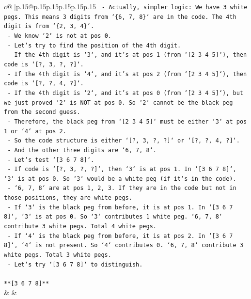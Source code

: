 \documentclass{article}
\begin{document}
{\begin{supertabular}{c@{$\;$}|p{.15\linewidth}@{}p{.15\linewidth}p{.15\linewidth}p{.15\linewidth}p{.15\linewidth}p{.15\linewidth}}
{{{\texttt{    {-} Actually, simpler logic: We have 3 white pegs. This means 3 digits from `\{6, 7, 8\}` are in the code. The 4th digit is from `\{2, 3, 4\}`.} \\
\texttt{    {-} We know `2` is not at pos 0.} \\
\texttt{    {-} Let's try to find the position of the 4th digit.} \\
\texttt{    {-} If the 4th digit is `3`, and it's at pos 1 (from `{[}2 3 4 5{]}`), then code is `{[}?, 3, ?, ?{]}`.} \\
\texttt{    {-} If the 4th digit is `4`, and it's at pos 2 (from `{[}2 3 4 5{]}`), then code is `{[}?, ?, 4, ?{]}`.} \\
\texttt{    {-} If the 4th digit is `2`, and it's at pos 0 (from `{[}2 3 4 5{]}`), but we just proved `2` is NOT at pos 0. So `2` cannot be the black peg from the second guess.} \\
\texttt{    {-} Therefore, the black peg from `{[}2 3 4 5{]}` must be either `3` at pos 1 or `4` at pos 2.} \\
\texttt{    {-} So the code structure is either `{[}?, 3, ?, ?{]}` or `{[}?, ?, 4, ?{]}`.} \\
\texttt{    {-} And the other three digits are `6, 7, 8`.} \\
\texttt{    {-} Let's test `{[}3 6 7 8{]}`.} \\
\texttt{        {-} If code is `{[}?, 3, ?, ?{]}`, then `3` is at pos 1. In `{[}3 6 7 8{]}`, `3` is at pos 0. So `3` would be a white peg (if it's in the code).} \\
\texttt{        {-} `6, 7, 8` are at pos 1, 2, 3. If they are in the code but not in those positions, they are white pegs.} \\
\texttt{        {-} If `3` is the black peg from before, it is at pos 1. In `{[}3 6 7 8{]}`, `3` is at pos 0. So `3` contributes 1 white peg. `6, 7, 8` contribute 3 white pegs. Total 4 white pegs.} \\
\texttt{        {-} If `4` is the black peg from before, it is at pos 2. In `{[}3 6 7 8{]}`, `4` is not present. So `4` contributes 0. `6, 7, 8` contribute 3 white pegs. Total 3 white pegs.} \\
\texttt{    {-} Let's try `{[}3 6 7 8{]}` to distinguish.} \\
\\ 
\texttt{**{[}3 6 7 8{]}**} \\
            }
        }
    }
    & & \\ \\


\end{supertabular}}
\end{document}
